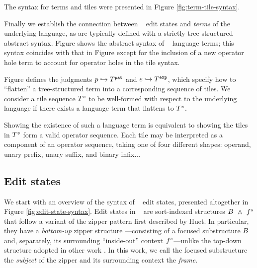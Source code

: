 The syntax for terms and tiles were presented in
Figure \ref{fig:term-tile-syntax}.




% 


Finally we establish the connection between
\ty~ edit states and \emph{terms} of the
underlying language, as are typically defined
with a strictly tree-structured abstract syntax.
Figure  shows the abstract syntax of
\ty~ language terms;
this syntax coincides with that in Figure 
except for the inclusion of a new operator hole term
to account for operator holes in the tile syntax.

Figure  defines the judgments
$p\hookrightarrow T^{\texttt{pat}}$
and
$e\hookrightarrow T^{\texttt{exp}}$,
which specify how to ``flatten'' a tree-structured
term into a corresponding sequence of tiles.
We consider a tile sequence $T^s$ to be well-formed
with respect to the underlying language if there exists
a language term that flattens to $T^s$.

Showing the existence of such a language term
is equivalent to showing the tiles in $T^s$
form a valid operator sequence.
Each tile may be interpreted as a component
of an operator sequence, taking one of four
different shapes: operand, unary prefix,
unary suffix, and binary infix...



\subsection{Edit states} \label{sec:edit-states}



We start with an overview of the syntax of \ty~ edit states,
presented altogether in Figure \ref{fig:edit-state-syntax}.
Edit states in \ty~ are sort-indexed structures
$\zipper{\subject}{\tfrelem^s}$ that follow a variant
of the zipper pattern first described by Huet.
In particular, they have a \emph{bottom-up}
zipper structure ---consisting of a focused substructure
$B$ and, separately,
its surrounding ``inside-out'' context $f^s$---unlike
the top-down structure adopted in other work .
In this work, we call the focused substructure the \emph{subject} of
the zipper and its surrounding context the \emph{frame}.

